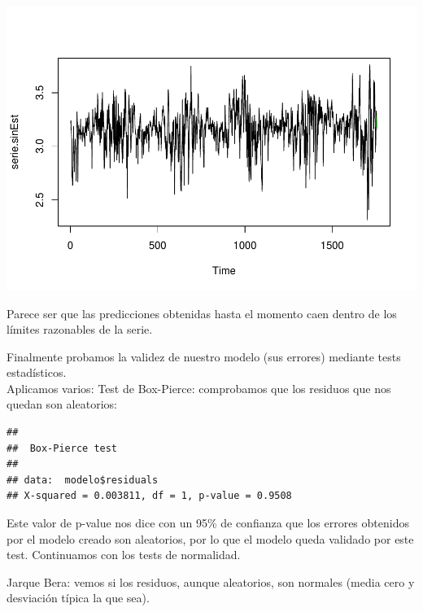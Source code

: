 \documentclass[]{article}
\newenvironment{Shaded}{\begin{snugshade}}{\end{snugshade}}
\newcommand{\KeywordTok}[1]{\textcolor[rgb]{0.13,0.29,0.53}{\textbf{#1}}}
\newcommand{\OperatorTok}[1]{\textcolor[rgb]{0.81,0.36,0.00}{\textbf{#1}}}
\newcommand{\NormalTok}[1]{#1}
\begin{document}
\includegraphics{exercise2_files/figure-latex/unnamed-chunk-27-1.pdf}

Parece ser que las predicciones obtenidas hasta el momento caen dentro
de los límites razonables de la serie.

Finalmente probamos la validez de nuestro modelo (sus errores) mediante
tests estadísticos.\\
Aplicamos varios: Test de Box-Pierce: comprobamos que los residuos que
nos quedan son aleatorios:

\begin{Shaded}
\end{Shaded}

\begin{verbatim}
## 
##  Box-Pierce test
## 
## data:  modelo$residuals
## X-squared = 0.003811, df = 1, p-value = 0.9508
\end{verbatim}

Este valor de p-value nos dice con un 95\% de conﬁanza que los errores
obtenidos por el modelo creado son aleatorios, por lo que el modelo
queda validado por este test. Continuamos con los tests de normalidad.

Jarque Bera: vemos si los residuos, aunque aleatorios, son normales
(media cero y desviación típica la que sea).

\begin{Shaded}
\end{Shaded}
\end{document}
